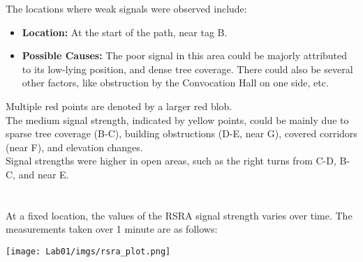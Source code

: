 \documentclass[a4paper, 11pt]{article}
\begin{document}
The locations where weak signals were observed include:

\begin{itemize}
    \item \textbf{Location:} At the start of the path, near tag B.
    \item \textbf{Possible Causes:} The poor signal in this area could be majorly attributed to its low-lying position, and dense tree coverage. There could also be several other factors, like obstruction by the Convocation Hall on one side, etc. 
\end{itemize}

Multiple red points are denoted by a larger red blob.\\

\vspace{10pt}
The medium signal strength, indicated by yellow points, could be mainly due to sparse tree coverage (B-C), building obstructions (D-E, near G), covered corridors (near F), and elevation changes. \\
Signal strengths were higher in open areas, such as the right turns from C-D, B-C, and near E.

\vspace{10pt}
\section{}

At a fixed location, the values of the RSRA signal strength varies over time. The measurements taken over 1 minute are as follows:

\vspace{0.5cm}
\begin{center}
    {\texttt{[image: Lab01/imgs/rsra\_plot.png]}}
\end{center}
\end{document}
